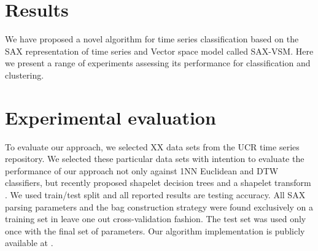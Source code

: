 \documentclass{llncs}
\begin{document}
\section{Results}
We have proposed a novel algorithm for time series classification based on the SAX
representation of time series and Vector space model called SAX-VSM. Here we present a range of
experiments assessing its performance for classification and clustering.

\section{Experimental evaluation}
To evaluate our approach, we selected XX data sets from the UCR time series repository.
We selected these particular data sets with intention to evaluate the performance of our approach
not only against 1NN Euclidean and DTW classifiers, but recently proposed shapelet decision trees
and a shapelet transform \cite{bagnal}.
We used train/test split and all reported results are testing accuracy. All SAX parsing parameters
and the bag construction strategy were found exclusively on a training set in leave one out 
cross-validation fashion. The test set was used only once with the final set of parameters. 
Our algorithm implementation is publicly available at \cite{jmotif}.
\end{document}
